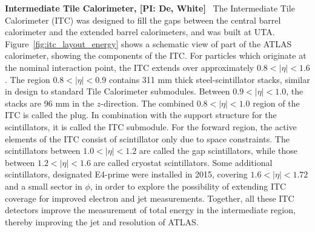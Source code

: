 \textbf{Intermediate Tile Calorimeter, [PI: De, White]} \
The Intermediate Tile Calorimeter (ITC) was designed to fill the
gaps between the central barrel calorimeter and the extended
barrel calorimeters, and was built at UTA. Figure~\ref{fig:itc_layout_energy} shows a schematic
view of part of the ATLAS calorimeter, showing the
components of the ITC. For particles which originate at the
nominal interaction point, the ITC extends over approximately $0.8
< |\eta| < 1.6$. The region $0.8 < |\eta| < 0.9$ contains 311 mm
thick steel-scintillator stacks, similar in design to standard
Tile Calorimeter submodules. Between $0.9 < |\eta| < 1.0$, the
stacks are 96 mm in the $z$-direction. The combined $0.8 < |\eta|
< 1.0$ region of the ITC is called the plug. In combination with
the support structure for the scintillators, it is called the ITC
submodule. For the forward region, the active elements of the ITC
consist of scintillator only due to space constraints. The
scintillators between $1.0 < |\eta| < 1.2$ are called the gap
scintillators, while those between $1.2 < |\eta| < 1.6$ are called
cryostat scintillators. Some additional scintillators, designated
E4-prime were installed in 2015, covering $1.6 < |\eta| < 1.72$ and
a small sector in $\phi$, in order to explore the possibility of extending
ITC coverage for improved electron and jet measurements.
Together, all these ITC detectors improve the measurement of
total energy in the intermediate region, thereby improving the jet
and \met resolution of ATLAS.


